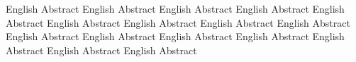 
\begin{enAbstract}
    English Abstract English Abstract English Abstract English Abstract English Abstract English Abstract English Abstract English Abstract English Abstract English Abstract English Abstract English Abstract English Abstract English Abstract English Abstract English Abstract

    \enAbsKeywords
\end{enAbstract}
